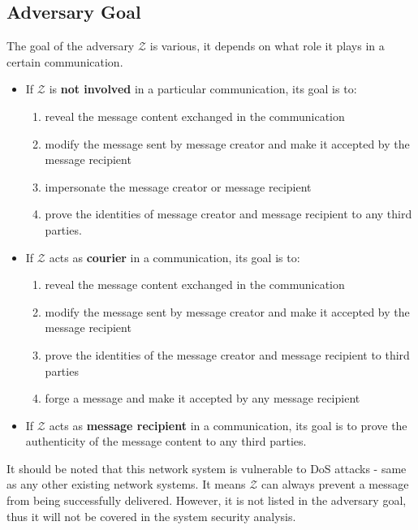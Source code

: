 \subsection{Adversary Goal}
The goal of the adversary $ \mathcal{Z} $ is various, it depends on what role it plays in a certain communication.
\begin{itemize}
\item If $ \mathcal{Z} $ is \textbf{not involved} in a particular communication, its goal is to:
 \begin{enumerate}
 \item reveal the message content exchanged in the communication
 \item modify the message sent by message creator and make it accepted by the message recipient
 \item impersonate the message creator or message recipient
 \item prove the identities of message creator and message recipient to any third parties.
 \end{enumerate}

\item If $ \mathcal{Z} $ acts as \textbf{courier} in a communication, its goal is to:
 \begin{enumerate}
 \item reveal the message content exchanged in the communication
 \item modify the message sent by message creator and make it accepted by the message recipient
 \item prove the identities of the message creator and message recipient to third parties
 \item forge a message and make it accepted by any message recipient
 \end{enumerate}
 
\item If $ \mathcal{Z} $ acts as \textbf{message recipient} in a communication, its goal is to prove the authenticity of the message content to any third parties.
\end{itemize}

It should be noted that this network system is vulnerable to DoS attacks - same as any other existing network systems. It means $\mathcal{Z}$ can always prevent a message from being successfully delivered. However, it is not listed in the adversary goal, thus it will not be covered in the system security analysis.